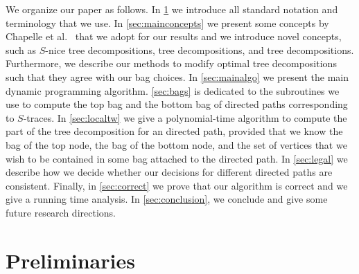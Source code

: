 \documentclass[a4paper,UKenglish,cleveref, autoref, thm-restate, numberwithinsect]{lipics-v2021}
\newcounter{algorithm}
\newcommand{\slim}{\text{slim}\xspace}
\newcommand{\topheavy}{\text{top-heavy}\xspace}
\begin{document}
We organize our paper as follows. In \cref{sec:prelims} we introduce all standard notation and terminology that we use. In \cref{sec:mainconcepts} we present some concepts by Chapelle et al.~\cite{chapelle2017treewidth} that we adopt for our results and we introduce novel concepts, such as $S$-nice tree decompositions, \slim tree decompositions, and \topheavy tree decompositions. Furthermore, we describe our methods to modify optimal tree decompositions such that they agree with our bag choices. In \cref{sec:mainalgo} we present the main dynamic programming algorithm. \cref{sec:bags} is dedicated to the subroutines we use to compute the top bag and the bottom bag of directed paths corresponding to $S$-traces. In \cref{sec:localtw} we give a polynomial-time algorithm to compute the part of the tree decomposition for an directed path, provided that we know the bag of the top node, the bag of the bottom node, and the set of vertices that we wish to be contained in some bag attached to the directed path. In \cref{sec:legal} we describe how we decide whether our decisions for different directed paths are consistent. Finally, in \cref{sec:correct} we prove that our algorithm is correct and we give a running time analysis. In \cref{sec:conclusion}, we conclude and give some future research directions.

\section{Preliminaries}\label{sec:prelims}
\end{document}
